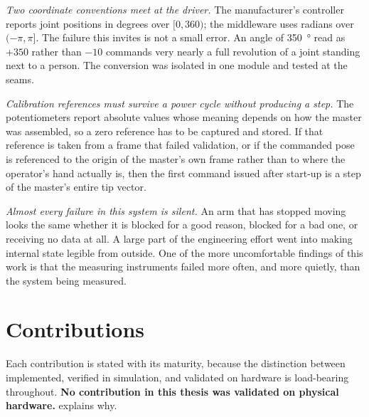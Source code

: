 \emph{Two coordinate conventions meet at the driver.} The manufacturer's
controller reports joint positions in degrees over $[0, 360)$; the middleware
uses radians over $(-\pi, \pi]$. The failure this invites is not a small
error. An angle of \SI{350}{\degree} read as $+350$ rather than $-10$ commands
very nearly a full revolution of a joint standing next to a person. The
conversion was isolated in one module and tested at the seams.

\emph{Calibration references must survive a power cycle without producing a
step.} The potentiometers report absolute values whose meaning depends on how
the master was assembled, so a zero reference has to be captured and stored.
If that reference is taken from a frame that failed validation, or if the
commanded pose is referenced to the origin of the master's own frame rather
than to where the operator's hand actually is, then the first command issued
after start-up is a step of the master's entire tip vector.

\emph{Almost every failure in this system is silent.} An arm that has stopped
moving looks the same whether it is blocked for a good reason, blocked for a
bad one, or receiving no data at all. A large part of the engineering effort
went into making internal state legible from outside. One of the more
uncomfortable findings of this work is that the measuring instruments failed
more often, and more quietly, than the system being measured.

\section{Contributions}

Each contribution is stated with its maturity, because the distinction between
implemented, verified in simulation, and validated on hardware is load-bearing
throughout. \textbf{No contribution in this thesis was validated on physical
hardware.}  explains why.

